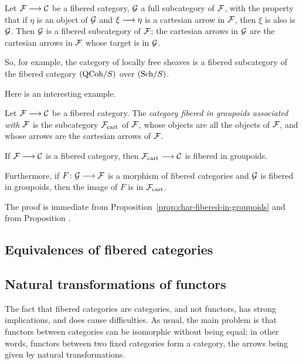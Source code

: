 \begin{3   FIBERED CATEGORIES}
\begin{3.4 Functors and cats fibered in sets}
\begin{example}
Let $\cF \arr \cC$ be a fibered category, $\mathcal{G}$ a full subcategory of $\mathcal{F}$, with the property that if $\eta$ is an object of $\mathcal{G}$ and $\xi \arr \eta$ is a cartesian arrow in $\mathcal{F}$, then $\xi$ is also is $\mathcal{G}$. Then $\mathcal{G}$ is a fibered subcategory of $\mathcal{F}$; the cartesian arrows in $\mathcal{G}$ are the cartesian arrows in $\mathcal{F}$ whose target is in $\mathcal{G}$.
\end{example}

So, for example, the category of locally free sheaves is a fibered subcategory of the fibered category $({\mathrm{QCoh}/S})$ over $({\mathrm{Sch}/S})$. 

Here is an interesting example.

\begin{definition}\label{def:ass-groupoids}
Let $\cF \arr \cC$ be a fibered category. The \emph{category fibered in groupoids associated with $\mathcal{F}$}%
%
%
\index{$\cF\cart$} is the subcategory $\cF\cart$ of $\mathcal{F}$, whose objects are all the objects of $\mathcal{F}$, and whose arrows are the cartesian arrows of $\mathcal{F}$.
\end{definition}

\begin{proposition}
If $\cF \arr \cC$ is a fibered category, then $\cF\cart \arr \cC$ is fibered in groupoids.

Furthermore, if $F\colon \cG \arr \cF$ is a morphism of fibered categories and $\mathcal{G}$ is fibered in groupoids, then the image of $F$ is in $\cF\cart$.
\end{proposition}

The proof is immediate from Proposition~\ref{prop:char-fibered-in-groupoids} and from Proposition .


\end{3.4 Functors and cats fibered in sets}
\begin{3.5 Equivalences of fibered categories}
\setcounter{section}{4}
\section{Equivalences of fibered categories}
\setcounter{theorem}{32}
\subsection{Natural transformations of functors}

The fact that fibered categories are categories, and not functors, has strong implications, and does cause difficulties. As usual, the main problem is that functors between categories can be isomorphic without being equal; in other words, functors between two fixed categories form a category, the arrows being given by natural transformations.


\end{3.5 Equivalences of fibered categories}
\end{3   FIBERED CATEGORIES}

